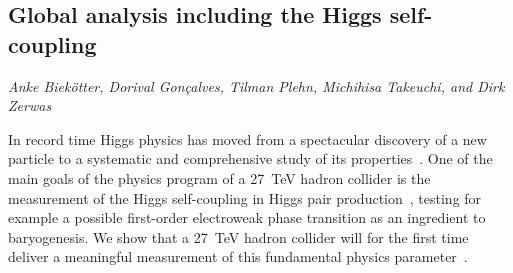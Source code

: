 
\subsection{Global analysis including the Higgs self-coupling}
\label{sec8:cubicetc}
\begin{center}
\textit{Anke Biek\"otter, Dorival Gon\c{c}alves, Tilman Plehn, Michihisa Takeuchi, and Dirk Zerwas}
\end{center}



In record time Higgs physics has moved from a spectacular discovery of
a new particle to a systematic and comprehensive study of its
properties~\cite{Dawson:2018dcd}. 
One of the main goals of the physics program of a 27~TeV hadron 
collider 
is the measurement of the Higgs self-coupling in Higgs pair
production~\cite{Baur:2003gp,Kling:2016lay,Goncalves:2018yva,Homiller:2018dgu,Barger:2013jfa,Barr:2014sga},
testing for example a possible first-order electroweak
phase transition as an ingredient to
baryogenesis. 
We show that a 27~TeV hadron collider will for the first time 
deliver a meaningful measurement of this fundamental physics 
parameter~\cite{Biekotter:2018jzu}. \medskip

